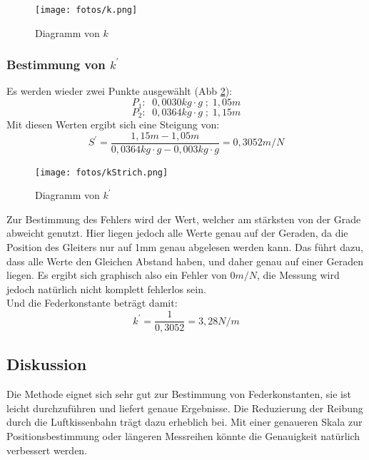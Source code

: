 \documentclass{article}
\begin{document}
              \begin{figure}[!ht]
                  \centering
                  \texttt{[image: fotos/k.png]}
                  \caption{\label{fig:k}Diagramm von $k$}
              \end{figure}

          \subsubsection{Bestimmung von $k^{\prime}$}
              Es werden wieder zwei Punkte ausgewählt (Abb \ref{fig:kStrich}):
              \[P_1:\;\; 0,0030kg\cdot g\; ;\; 1,05m\]
              \[P_2:\;\; 0,0364kg\cdot g\; ;\; 1,15m\]
              Mit diesen Werten ergibt sich eine Steigung von:
              \begin{equation}
                  S^{\prime} = \frac{1,15m - 1,05m}{0,0364kg\cdot g - 0,003kg\cdot g} = 0,3052 m/N
              \end{equation}
              \begin{figure}[!ht]
                \centering
                \texttt{[image: fotos/kStrich.png]}
                \caption{\label{fig:kStrich}Diagramm von $k^{\prime}$}
            \end{figure}
              Zur Bestimmung des Fehlers wird der Wert, welcher am stärksten von der Grade abweicht genutzt.
              Hier liegen jedoch alle Werte genau auf der Geraden, da die Position des Gleiters nur auf 1mm genau abgelesen werden kann.
              Das führt dazu, dass alle Werte den Gleichen Abstand haben, und daher genau auf einer Geraden liegen.
              Es ergibt sich graphisch also ein Fehler von $0 m/N$, die Messung wird jedoch natürlich nicht komplett fehlerlos sein.\\
              Und die Federkonstante beträgt damit:
              \begin{equation}
                  k^{\prime} = \frac{1}{0,3052} = 3,28N/m
              \end{equation}

      \subsection{Diskussion}
          Die Methode eignet sich sehr gut zur Bestimmung von Federkonstanten, sie ist leicht durchzuführen und liefert genaue Ergebnisse. Die Reduzierung der Reibung durch die Luftkissenbahn trägt dazu erheblich bei. Mit einer genaueren Skala zur Positionsbestimmung oder längeren Messreihen könnte die Genauigkeit natürlich verbessert werden.
\end{document}
